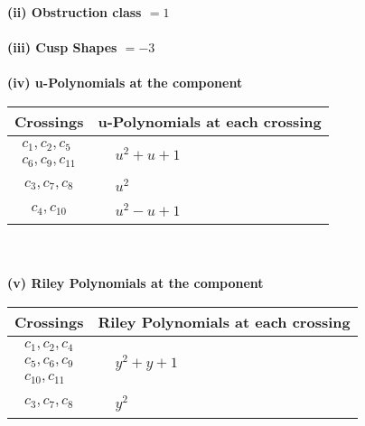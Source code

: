 \documentclass[1p]{elsarticle_modified}
\theoremstyle{definition}
\begin{document}
\flushleft \textbf{(ii) Obstruction class $= 1$}\\~\\
\flushleft \textbf{(iii) Cusp Shapes $= -3$}\\~\\
\newpage\renewcommand{\arraystretch}{1}
\flushleft \textbf{(iv) u-Polynomials at the component}\newline \\
\begin{tabular}{m{50pt}|m{274pt}}
Crossings & \hspace{64pt}u-Polynomials at each crossing \\
\hline $$\begin{aligned}c_{1},c_{2},c_{5}\\c_{6},c_{9},c_{11}\end{aligned}$$&$\begin{aligned}
&u^2+u+1
\end{aligned}$\\
\hline $$\begin{aligned}c_{3},c_{7},c_{8}\end{aligned}$$&$\begin{aligned}
&u^2
\end{aligned}$\\
\hline $$\begin{aligned}c_{4},c_{10}\end{aligned}$$&$\begin{aligned}
&u^2- u+1
\end{aligned}$\\
\hline
\end{tabular}\\~\\
\newpage\renewcommand{\arraystretch}{1}
\flushleft \textbf{(v) Riley Polynomials at the component}\newline \\
\begin{tabular}{m{50pt}|m{274pt}}
Crossings & \hspace{64pt}Riley Polynomials at each crossing \\
\hline $$\begin{aligned}c_{1},c_{2},c_{4}\\c_{5},c_{6},c_{9}\\c_{10},c_{11}\end{aligned}$$&$\begin{aligned}
&y^2+y+1
\end{aligned}$\\
\hline $$\begin{aligned}c_{3},c_{7},c_{8}\end{aligned}$$&$\begin{aligned}
&y^2
\end{aligned}$\\
\hline
\end{tabular}\\~\\
\end{document}
